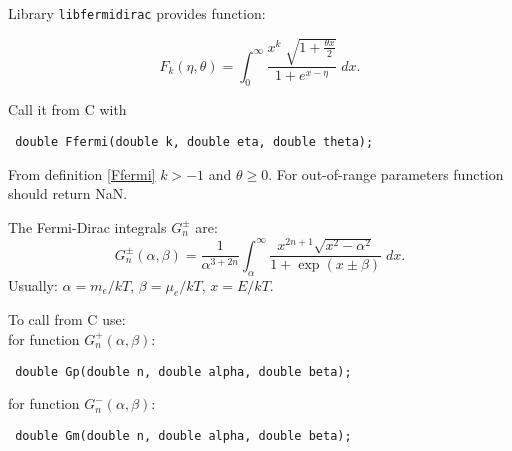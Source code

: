 \documentclass{article}
\begin{document}
Library \texttt{libfermidirac} provides function:

\begin{equation}
\label{Ffermi}
F_k(\eta, \theta) 
= 
\int_0^\infty
\frac{x^k \; \sqrt{1+ \frac{\theta x}{2}}}{1+e^{x-\eta}} \; dx.
\end{equation}


Call it from C with
\begin{flushleft}
\tt
double Ffermi(double k, double eta, double theta);
\end{flushleft}


From definition \eqref{Ffermi} $k>-1$ and $\theta \geq 0$. For out-of-range parameters
function should return NaN.

The Fermi-Dirac integrals $G_n^{\pm}$ are:
\begin{equation}
\label{Gfermi}
G_n^{\pm}(\alpha, \beta) =
\frac{1}{\alpha^{3+2 n}} \int_{\alpha}^{\infty} \frac{x^{2 n+1 } \sqrt{x^2-\alpha^2}}{1+\exp(x\pm \beta)} \; dx.
\end{equation}
Usually: $\alpha = m_e/kT$, $\beta = \mu_e/kT$, $x=E/kT$.

To call from C use:\\
for function $G_n^+(\alpha,\beta)$:
\begin{flushleft}
\tt
double Gp(double n, double alpha, double beta);
\end{flushleft}


for function $G_n^-(\alpha,\beta)$:
\begin{flushleft}
\tt
double Gm(double n, double alpha, double beta);
\end{flushleft}
\end{document}

